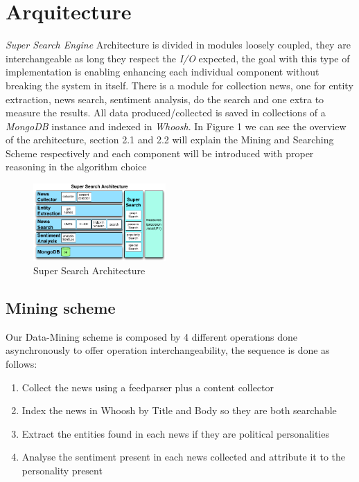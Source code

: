 \documentclass{acm_proc_article-sp}
\begin{document}
\section{Arquitecture}
\textit{Super Search Engine} Architecture is divided in modules loosely coupled, they are interchangeable as long they respect the \textit{I/O} expected, the goal with this type of implementation is enabling enhancing each individual component without breaking the system in itself. There is a module for collection news, one for entity extraction, news search, sentiment analysis, do the search and one extra to measure the results. All data produced/collected is saved in collections of a \textit{MongoDB} instance and indexed in \textit{Whoosh}. In Figure 1 we can see the overview of the architecture, section 2.1 and 2.2 will explain the Mining and Searching Scheme respectively and each component will be introduced with proper reasoning in the algorithm choice

	\begin{figure}[h]
   	\centering
   	\includegraphics[width=0.45\textwidth]{architecture.png}
   	\caption{Super Search Architecture}
	\end{figure}


\subsection{Mining scheme}

Our Data-Mining scheme is composed by 4 different operations done asynchronously to offer operation interchangeability, the sequence is done as follows:

\begin{enumerate}
  \item Collect the news using a feedparser plus a content collector 
  \item Index the news in Whoosh by Title and Body so they are both searchable
  \item Extract the entities found in each news if they are political personalities
  \item Analyse the sentiment present in each news collected and attribute it to the personality present
\end{enumerate} 
\end{document}
